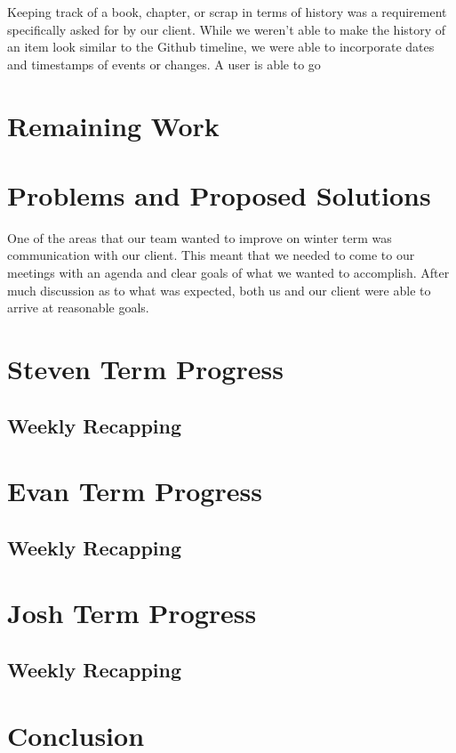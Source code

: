 \documentclass[onecolumn, draftclsnofoot,10pt, compsoc]{IEEEtran}
\begin{document}
\noindent Keeping track of a book, chapter, or scrap in terms of history was a requirement specifically 
asked for by our client. While we weren't able to make the history of an item look similar to the Github
timeline, we were able to incorporate dates and timestamps of events or changes. A user is able to go

\noindent

\section{Remaining Work} 

\newpage

\section{Problems and Proposed Solutions} 

\noindent One of the areas that our team wanted to improve on winter term was communication with 
our client. This meant that we needed to come to our meetings with an agenda and clear goals of 
what we wanted to accomplish. After much discussion as to what was expected, both us and our client
were able to arrive at reasonable goals. \\

\newpage

\section{Steven Term Progress}

\subsection{Weekly Recapping}

\section{Evan Term Progress}

\subsection{Weekly Recapping}

\section{Josh Term Progress}
\subsection{Weekly Recapping}

\section{Conclusion}
\end{document}
